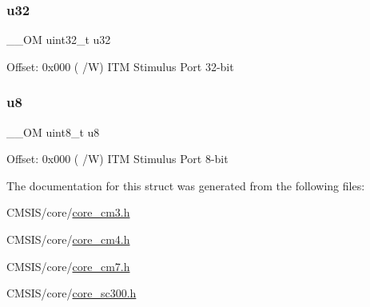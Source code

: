 \subsubsection{\texorpdfstring{u32}{u32}}
{\footnotesize\ttfamily \+\_\+\+\_\+\+OM uint32\+\_\+t u32}

Offset\+: 0x000 ( /W) I\+TM Stimulus Port 32-\/bit \mbox{\label{struct_i_t_m___type_a4c0550e859d614c607bd4b575f05425c}} 
\subsubsection{\texorpdfstring{u8}{u8}}
{\footnotesize\ttfamily \+\_\+\+\_\+\+OM uint8\+\_\+t u8}

Offset\+: 0x000 ( /W) I\+TM Stimulus Port 8-\/bit 

The documentation for this struct was generated from the following files\+:\begin{DoxyCompactItemize}
\item 
C\+M\+S\+I\+S/core/\hyperlink{core__cm3_8h}{core\+\_\+cm3.\+h}\item 
C\+M\+S\+I\+S/core/\hyperlink{core__cm4_8h}{core\+\_\+cm4.\+h}\item 
C\+M\+S\+I\+S/core/\hyperlink{core__cm7_8h}{core\+\_\+cm7.\+h}\item 
C\+M\+S\+I\+S/core/\hyperlink{core__sc300_8h}{core\+\_\+sc300.\+h}\end{DoxyCompactItemize}
